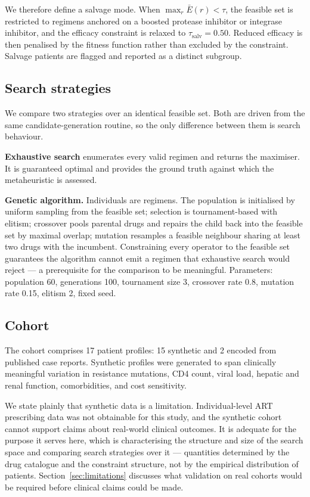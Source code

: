 \documentclass[conference]{IEEEtran}
\begin{document}
We therefore define a salvage mode. When $\max_r \bar{E}(r) < \tau$, the feasible set is restricted to regimens anchored on a boosted protease inhibitor or integrase inhibitor, and the efficacy constraint is relaxed to $\tau_{\text{salv}} = 0.50$. Reduced efficacy is then penalised by the fitness function rather than excluded by the constraint. Salvage patients are flagged and reported as a distinct subgroup.

\subsection{Search strategies}\label{sec:search}

We compare two strategies over an identical feasible set. Both are driven from the same candidate-generation routine, so the only difference between them is search behaviour.

\textbf{Exhaustive search} enumerates every valid regimen and returns the maximiser. It is guaranteed optimal and provides the ground truth against which the metaheuristic is assessed.

\textbf{Genetic algorithm.} Individuals are regimens. The population is initialised by uniform sampling from the feasible set; selection is tournament-based with elitism; crossover pools parental drugs and repairs the child back into the feasible set by maximal overlap; mutation resamples a feasible neighbour sharing at least two drugs with the incumbent. Constraining every operator to the feasible set guarantees the algorithm cannot emit a regimen that exhaustive search would reject --- a prerequisite for the comparison to be meaningful. Parameters: population 60, generations 100, tournament size 3, crossover rate 0.8, mutation rate 0.15, elitism 2, fixed seed.

\subsection{Cohort}\label{sec:cohort}

The cohort comprises 17 patient profiles: 15 synthetic and 2 encoded from published case reports. Synthetic profiles were generated to span clinically meaningful variation in resistance mutations, CD4 count, viral load, hepatic and renal function, comorbidities, and cost sensitivity.

We state plainly that synthetic data is a limitation. Individual-level ART prescribing data was not obtainable for this study, and the synthetic cohort cannot support claims about real-world clinical outcomes. It is adequate for the purpose it serves here, which is characterising the structure and size of the search space and comparing search strategies over it --- quantities determined by the drug catalogue and the constraint structure, not by the empirical distribution of patients. Section~\ref{sec:limitations} discusses what validation on real cohorts would be required before clinical claims could be made.
\end{document}
